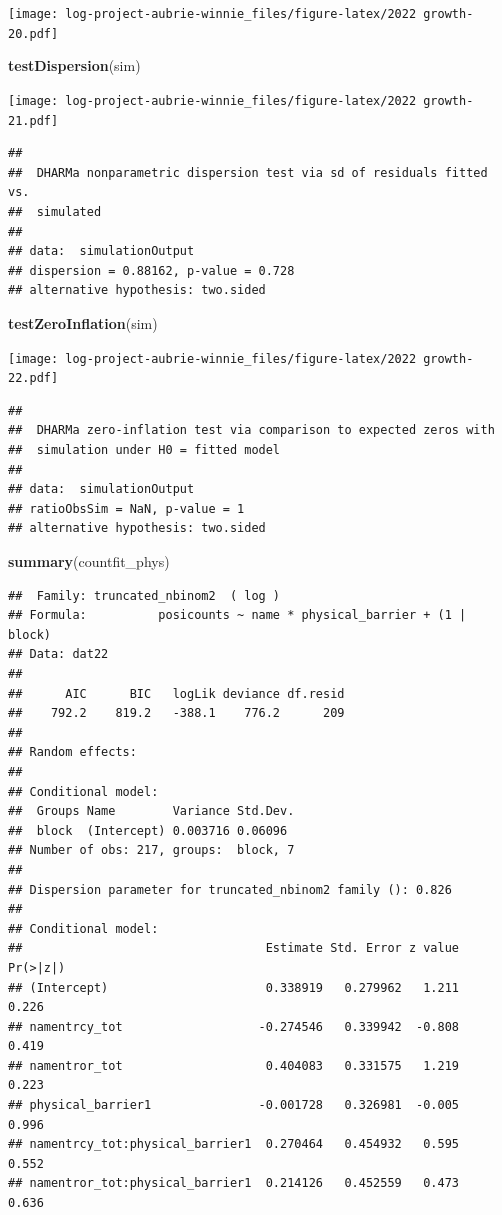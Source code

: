 \documentclass[
]{article}
\newenvironment{Shaded}{\begin{snugshade}}{\end{snugshade}}
\newcommand{\FunctionTok}[1]{\textcolor[rgb]{0.13,0.29,0.53}{\textbf{#1}}}
\newcommand{\NormalTok}[1]{#1}
\begin{document}
\texttt{[image: log-project-aubrie-winnie\_files/figure-latex/2022 growth-20.pdf]}

\begin{Shaded}
\begin{Highlighting}[]
\FunctionTok{testDispersion}\NormalTok{(sim)}
\end{Highlighting}
\end{Shaded}

\texttt{[image: log-project-aubrie-winnie\_files/figure-latex/2022 growth-21.pdf]}

\begin{verbatim}
## 
##  DHARMa nonparametric dispersion test via sd of residuals fitted vs.
##  simulated
## 
## data:  simulationOutput
## dispersion = 0.88162, p-value = 0.728
## alternative hypothesis: two.sided
\end{verbatim}

\begin{Shaded}
\begin{Highlighting}[]
\FunctionTok{testZeroInflation}\NormalTok{(sim)}
\end{Highlighting}
\end{Shaded}

\texttt{[image: log-project-aubrie-winnie\_files/figure-latex/2022 growth-22.pdf]}

\begin{verbatim}
## 
##  DHARMa zero-inflation test via comparison to expected zeros with
##  simulation under H0 = fitted model
## 
## data:  simulationOutput
## ratioObsSim = NaN, p-value = 1
## alternative hypothesis: two.sided
\end{verbatim}

\begin{Shaded}
\begin{Highlighting}[]
\FunctionTok{summary}\NormalTok{(countfit\_phys)}
\end{Highlighting}
\end{Shaded}

\begin{verbatim}
##  Family: truncated_nbinom2  ( log )
## Formula:          posicounts ~ name * physical_barrier + (1 | block)
## Data: dat22
## 
##      AIC      BIC   logLik deviance df.resid 
##    792.2    819.2   -388.1    776.2      209 
## 
## Random effects:
## 
## Conditional model:
##  Groups Name        Variance Std.Dev.
##  block  (Intercept) 0.003716 0.06096 
## Number of obs: 217, groups:  block, 7
## 
## Dispersion parameter for truncated_nbinom2 family (): 0.826 
## 
## Conditional model:
##                                  Estimate Std. Error z value Pr(>|z|)
## (Intercept)                      0.338919   0.279962   1.211    0.226
## namentrcy_tot                   -0.274546   0.339942  -0.808    0.419
## namentror_tot                    0.404083   0.331575   1.219    0.223
## physical_barrier1               -0.001728   0.326981  -0.005    0.996
## namentrcy_tot:physical_barrier1  0.270464   0.454932   0.595    0.552
## namentror_tot:physical_barrier1  0.214126   0.452559   0.473    0.636
\end{verbatim}
\end{document}
